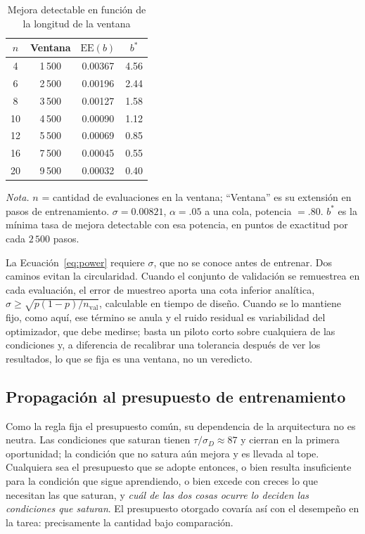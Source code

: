 \documentclass[jou,11pt,donotrepeattitle]{apa7}
\begin{document}
\begin{table}[htbp]
\caption{Mejora detectable en funci\'on de la longitud de la ventana}
\label{tab:pot}
\small
\begin{tabular}{cccc}
\toprule
$n$ & Ventana & $\mathrm{EE}(b)$ & $b^{*}$ \\
\midrule
4  & 1\,500 & 0.00367 & 4.56 \\
6  & 2\,500 & 0.00196 & 2.44 \\
8  & 3\,500 & 0.00127 & 1.58 \\
10 & 4\,500 & 0.00090 & 1.12 \\
12 & 5\,500 & 0.00069 & 0.85 \\
16 & 7\,500 & 0.00045 & 0.55 \\
20 & 9\,500 & 0.00032 & 0.40 \\
\bottomrule
\end{tabular}

\vspace{5pt}
{\small\raggedright \textit{Nota.} $n$ = cantidad de evaluaciones en la ventana; ``Ventana'' es
su extensi\'on en pasos de entrenamiento. $\sigma = 0.00821$, $\alpha = .05$ a una cola,
potencia $= .80$. $b^{*}$ es la m\'inima tasa de mejora detectable con esa potencia, en puntos de
exactitud por cada $2\,500$ pasos.
\par}
\end{table}

La Ecuaci\'on~\ref{eq:power} requiere $\sigma$, que no se conoce antes de entrenar. Dos caminos
evitan la circularidad. Cuando el conjunto de validaci\'on se remuestrea en cada evaluaci\'on, el
error de muestreo aporta una cota inferior anal\'itica,
$\sigma \geq \sqrt{p(1-p)/n_{\text{val}}}$, calculable en tiempo de dise\~no. Cuando se lo
mantiene fijo, como aqu\'i, ese t\'ermino se anula y el ruido residual es variabilidad del
optimizador, que debe medirse; basta un piloto corto sobre cualquiera de las condiciones y, a
diferencia de recalibrar una tolerancia despu\'es de ver los resultados, lo que se fija es una
ventana, no un veredicto.

\subsection{Propagaci\'on al presupuesto de entrenamiento}

Como la regla fija el presupuesto com\'un, su dependencia de la arquitectura no es neutra. Las
condiciones que saturan tienen $\tau/\sigma_D \approx 87$ y cierran en la primera oportunidad; la
condici\'on que no satura a\'un mejora y es llevada al tope. Cualquiera sea el presupuesto que se
adopte entonces, o bien resulta insuficiente para la condici\'on que sigue aprendiendo, o bien
excede con creces lo que necesitan las que saturan, y \emph{cu\'al de las dos cosas ocurre lo
deciden las condiciones que saturan}. El presupuesto otorgado covar\'ia as\'i con el desempe\~no
en la tarea: precisamente la cantidad bajo comparaci\'on.
\end{document}
